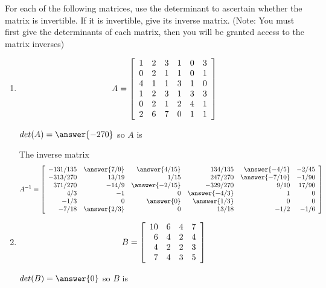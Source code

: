 \documentclass{ximera}
\author{Zack Reed}
\begin{document}
\begin{problem}
  For each of the following matrices, use the determinant to ascertain whether the matrix is invertible. If it is invertible, give its inverse matrix. (Note: You must first give the determinants of each matrix, then you will be granted access to the matrix inverses)
  \begin{enumerate}
    \item \begin{equation*}
    A =
    \startmat{rrrrrr}
     1&2&3&1&0&3\\
     0&2&1&1&0&1\\
     4&1&1&3&1&0\\
     1&2&3&1&3&3\\
     0&2&1&2&4&1\\
     2&6&7&0&1&1\\
     \stopmat
      
  \end{equation*}

  $det(A)=\answer{-270}$ so $A$ is \begin{multipleChoice}
  \end{multipleChoice}

  \begin{problem}
    The inverse matrix 
    \begin{equation*}
      A^{-1} =
      \startmat{rrrrrr}
       -131/135&\answer{7/9}&\answer{4/15}&134/135&\answer{-4/5}&-2/45\\
       -313/270&13/19&1/15&247/270&\answer{-7/10}&-1/90\\
       371/270&-14/9&\answer{-2/15}&-329/270&9/10&17/90\\
       4/3&-1&0&\answer{-4/3}&1&0\\
       -1/3&0&\answer{0}&\answer{1/3}&0&0\\
       -7/18&\answer{2/3}&0&13/18&-1/2&-1/6\\
       \stopmat
    \end{equation*}
  \end{problem}

  \item \begin{equation*}
    B =
    \startmat{rrrr}
    10&6&4&7\\
    6&4&2&4\\
    4&2&2&3\\
    7&4&3&5\\
     \stopmat
  
    \end{equation*}
    

     $det(B)=\answer{0}$ so $B$ is \begin{multipleChoice}
      \end{multipleChoice}

  \end{enumerate}

\end{problem}
\end{document}
